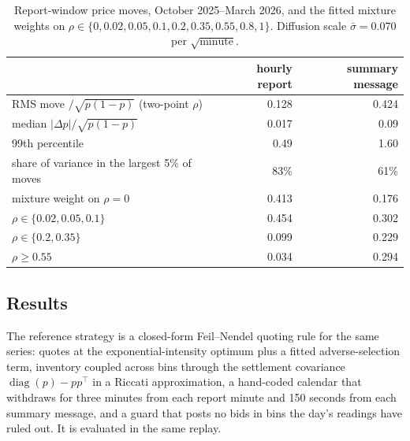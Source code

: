 \documentclass[11pt]{article}
\newcommand{\1}{\mathbf 1}
\begin{document}
\begin{table}[htbp]
\centering\small
\begin{tabular}{lrr}
\toprule
& hourly report & summary message\\
\midrule
RMS move $/\sqrt{p(1-p)}$ (two-point $\rho$) & 0.128 & 0.424\\
median $|\Delta p|/\sqrt{p(1-p)}$ & 0.017 & 0.09\\
99th percentile & 0.49 & 1.60\\
share of variance in the largest 5\% of moves & 83\% & 61\%\\
\midrule
mixture weight on $\rho=0$ & 0.413 & 0.176\\
\hphantom{mixture weight on} $\rho\in\{0.02,0.05,0.1\}$ & 0.454 & 0.302\\
\hphantom{mixture weight on} $\rho\in\{0.2,0.35\}$ & 0.099 & 0.229\\
\hphantom{mixture weight on} $\rho\ge0.55$ & 0.034 & 0.294\\
\bottomrule
\end{tabular}
\caption{Report-window price moves, October 2025--March 2026, and the fitted
mixture weights on $\rho\in\{0,0.02,0.05,0.1,0.2,0.35,0.55,0.8,1\}$. Diffusion
scale $\bar\sigma=0.070$ per $\sqrt{\text{minute}}$.}
\label{tab:weathercal}
\end{table}

\subsection{Results}
The reference strategy is a closed-form Feil--Nendel quoting rule for the same series: quotes at the
exponential-intensity optimum plus a fitted adverse-selection term, inventory coupled across bins through the
settlement covariance $\operatorname{diag}(p)-pp^\top$ in a Riccati approximation, a hand-coded calendar that
withdraws for three minutes from each report minute and 150 seconds from each summary message, and a guard
that posts no bids in bins the day's readings have ruled out. It is evaluated in the same replay.
\end{document}
